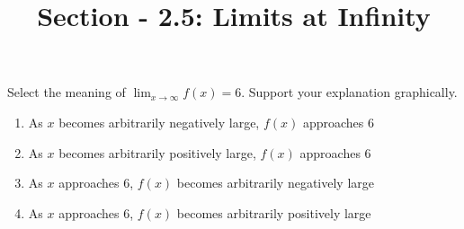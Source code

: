 \documentclass[nooutcomes,handout]{ximera}
\title{Section - 2.5:  Limits at Infinity}
\begin{document}
\begin{abstract}		\end{abstract}
\maketitle

\begin{problem}
	Select the meaning of $\lim_{x \to \infty} f(x)=6$.  Support your explanation graphically.

	\begin{enumerate}
	\item As $x$ becomes arbitrarily negatively large, $f(x)$ approaches $6$
	\item As $x$ becomes arbitrarily positively large, $f(x)$ approaches $6$
	\item As $x$ approaches 6, $f(x)$ becomes arbitrarily negatively large
	\item As $x$ approaches 6, $f(x)$ becomes arbitrarily positively large
	\end{enumerate}


\end{problem}
\end{document}
